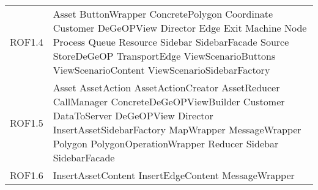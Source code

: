 \begin{longtable}{p{2.5cm}!{\VRule[1pt]}p{5cm}}
		ROF1.4 & Asset \newline ButtonWrapper \newline ConcretePolygon \newline Coordinate \newline Customer \newline DeGeOPView \newline Director \newline Edge \newline Exit \newline Machine \newline Node \newline Process \newline Queue \newline Resource \newline Sidebar \newline SidebarFacade \newline Source \newline StoreDeGeOP \newline TransportEdge \newline ViewScenarioButtons \newline ViewScenarioContent \newline ViewScenarioSidebarFactory\\
		ROF1.5 & Asset \newline AssetAction \newline AssetActionCreator \newline AssetReducer \newline CallManager \newline ConcreteDeGeOPViewBuilder \newline Customer \newline DataToServer \newline DeGeOPView \newline Director \newline InsertAssetSidebarFactory \newline MapWrapper \newline MessageWrapper \newline Polygon \newline PolygonOperationWrapper \newline Reducer \newline Sidebar \newline SidebarFacade\\
		ROF1.6 & InsertAssetContent \newline InsertEdgeContent \newline MessageWrapper\\

\end{longtable}
